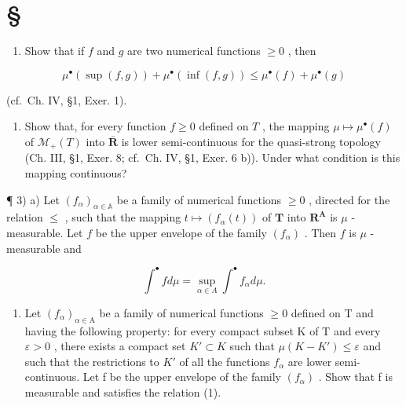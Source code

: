 \section*{\texorpdfstring{\S\CurrentExerciseGroup}{Section \CurrentExerciseGroup}}
{}

\begin{enumerate}
\def\labelenumi{\arabic{enumi})}
\tightlist
\item
  Show that if \(f\) and \(g\) are two numerical functions \(\geqslant 0\) , then
\end{enumerate}

\[
\mu^ {\bullet} (\sup (f, g)) + \mu^ {\bullet} (\inf (f, g)) \leqslant \mu^ {\bullet} (f) + \mu^ {\bullet} (g)
\]

(cf.~Ch. IV, §1, Exer. 1).

\begin{enumerate}
\def\labelenumi{\arabic{enumi})}
\setcounter{enumi}{1}
\tightlist
\item
  Show that, for every function \(f \geqslant 0\) defined on \(T\) , the mapping \(\mu \mapsto \mu^{\bullet}(f)\) of \(\mathcal{M}_{+}(T)\) into \(\overline{\mathbf{R}}\) is lower semi-continuous for the quasi-strong topology (Ch. III, §1, Exer. 8; cf.~Ch. IV, §1, Exer. 6 b)). Under what condition is this mapping continuous?
\end{enumerate}

¶ 3) a) Let \((f_{\alpha})_{\alpha \in \mathbb{A}}\) be a family of numerical functions \(\geqslant 0\) , directed for the relation \(\leqslant\) , such that the mapping \(t \mapsto (f_{\alpha}(t))\) of \(\mathbf{T}\) into \(\mathbf{R}^{\mathbf{A}}\) is \(\mu\) -measurable. Let \(f\) be the upper envelope of the family \((f_{\alpha})\) . Then \(f\) is \(\mu\) -measurable and

\[
\int^ {\bullet} f d \mu = \sup _ {\alpha \in A} \int^ {\bullet} f _ {\alpha} d \mu .\tag{1}
\]

\begin{enumerate}
\def\labelenumi{\alph{enumi})}
\setcounter{enumi}{1}
\tightlist
\item
  Let \((f_{\alpha})_{\alpha\in\mathrm{A}}\) be a family of numerical functions \(\geqslant0\) defined on T and having the following property: for every compact subset K of T and every \(\varepsilon>0\) , there exists a compact set \(K'\subset K\) such that \(\mu(K-K')\leqslant\varepsilon\) and such that the restrictions to \(K'\) of all the functions \(f_{\alpha}\) are lower semi-continuous. Let f be the upper envelope of the family \((f_{\alpha})\) . Show that f is measurable and satisfies the relation (1).
\end{enumerate}

